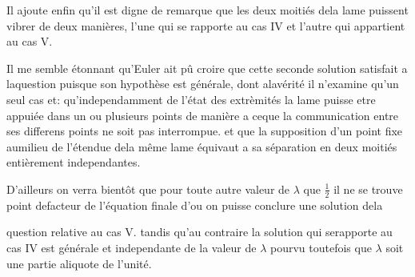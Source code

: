 \documentclass[11pt,a4paper]{article}
\begin{document}
Il ajoute enfin qu'il est digne de remarque que les deux moitiés dela lame
puissent vibrer de deux manières, l'une qui se rapporte au cas IV et l'autre
qui appartient au cas V.

Il me semble étonnant qu'Euler ait pû croire que cette seconde solution satisfait
a laquestion puisque son hypothèse est générale, dont alavérité il n'examine
qu'un seul cas et: qu'independamment de l'état des extrèmités la lame puisse
 etre appuiée dans un ou plusieurs points de manière a ceque la
communication entre ses differens points ne soit pas interrompue. et que la
supposition d'un point fixe aumilieu de l'étendue dela même lame équivaut
a sa séparation en deux moitiés entièrement independantes.

D'ailleurs on verra bientôt que pour toute autre valeur de $\lambda$ que $\frac{1}{2}$ il ne se
trouve point defacteur de l'équation finale d'ou on puisse conclure une solution dela


question relative au cas V. tandis qu'au contraire la solution qui serapporte au cas IV
est générale et independante de la valeur de $\lambda$ pourvu toutefois que $\lambda$ soit une
partie aliquote de l'unité.
\end{document}
